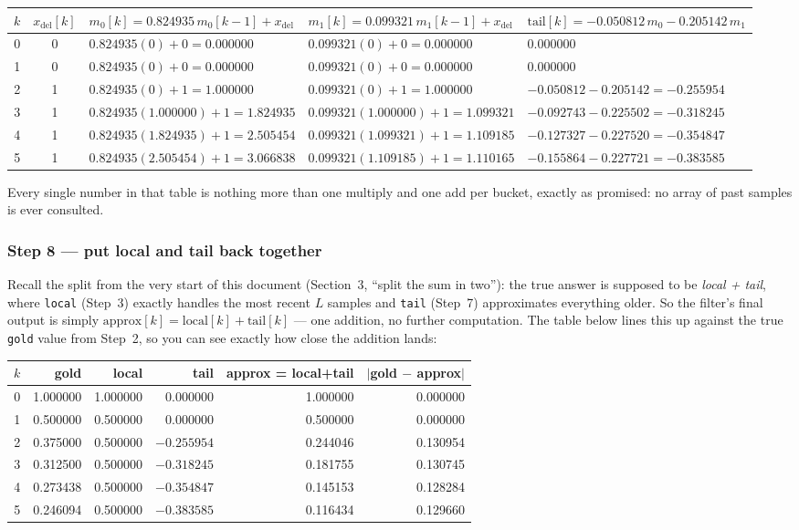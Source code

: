 \documentclass[11pt]{article}
\begin{document}
\begin{center}
\small
\begin{tabular}{c c l l l}
\toprule
$k$ & $x_{\text{del}}[k]$ & $m_0[k]=0.824935\,m_0[k{-}1]+x_{\text{del}}$ & $m_1[k]=0.099321\,m_1[k{-}1]+x_{\text{del}}$ & $\text{tail}[k]=-0.050812\,m_0-0.205142\,m_1$ \\
\midrule
0 & 0 & $0.824935(0)+0=0.000000$ & $0.099321(0)+0=0.000000$ & $0.000000$ \\
1 & 0 & $0.824935(0)+0=0.000000$ & $0.099321(0)+0=0.000000$ & $0.000000$ \\
2 & 1 & $0.824935(0)+1=1.000000$ & $0.099321(0)+1=1.000000$ & $-0.050812-0.205142=-0.255954$ \\
3 & 1 & $0.824935(1.000000)+1=1.824935$ & $0.099321(1.000000)+1=1.099321$ & $-0.092743-0.225502=-0.318245$ \\
4 & 1 & $0.824935(1.824935)+1=2.505454$ & $0.099321(1.099321)+1=1.109185$ & $-0.127327-0.227520=-0.354847$ \\
5 & 1 & $0.824935(2.505454)+1=3.066838$ & $0.099321(1.109185)+1=1.110165$ & $-0.155864-0.227721=-0.383585$ \\
\bottomrule
\end{tabular}
\end{center}
Every single number in that table is nothing more than one multiply and one add per bucket, exactly as promised: no array of past samples is ever consulted.

\subsubsection*{Step 8 --- put local and tail back together}
Recall the split from the very start of this document (Section~3, ``split the sum in two''): the true answer is supposed to be \emph{local + tail}, where \texttt{local} (Step~3) exactly handles the most recent $L$ samples and \texttt{tail} (Step~7) approximates everything older. So the filter's final output is simply $\text{approx}[k] = \text{local}[k] + \text{tail}[k]$ --- one addition, no further computation. The table below lines this up against the true \texttt{gold} value from Step~2, so you can see exactly how close the addition lands:
\begin{center}
\small
\begin{tabular}{c r r r r r}
\toprule
$k$ & gold & local & tail & approx = local+tail & $|$gold $-$ approx$|$ \\
\midrule
0 & 1.000000 & 1.000000 & 0.000000 & 1.000000 & 0.000000 \\
1 & 0.500000 & 0.500000 & 0.000000 & 0.500000 & 0.000000 \\
2 & 0.375000 & 0.500000 & $-0.255954$ & 0.244046 & 0.130954 \\
3 & 0.312500 & 0.500000 & $-0.318245$ & 0.181755 & 0.130745 \\
4 & 0.273438 & 0.500000 & $-0.354847$ & 0.145153 & 0.128284 \\
5 & 0.246094 & 0.500000 & $-0.383585$ & 0.116434 & 0.129660 \\
\bottomrule
\end{tabular}
\end{center}
\end{document}
